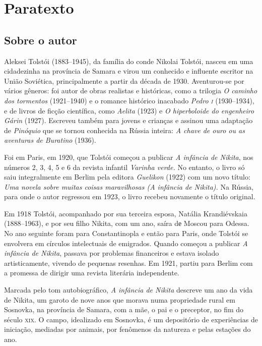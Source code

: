 \chapter{Paratexto}\label{paratexto}

\section{Sobre o autor}\label{para1}

Aleksei Tolstói (1883--1945), da família do conde Nikolai Tolstói,
nasceu em uma cidadezinha na província de Samara e virou um conhecido e
influente escritor na União Soviética, principalmente a partir da década
de 1930. Aventurou-se por vários gêneros: foi autor de obras realistas e
históricas, como a trilogia \emph{O caminho dos tormentos} (1921--1940) e
o romance histórico inacabado \emph{Pedro \textsc{i}} (1930--1934), e de livros de
ficção científica, como \emph{Aelita} (1923) e \emph{O hiperboloide do
engenheiro Gárin} (1927). Escreveu também para jovens e crianças e
assinou uma adaptação de \emph{Pinóquio} que se tornou conhecida na
Rússia inteira: \emph{A chave de ouro ou as aventuras de Buratino}
(1936).

Foi em Paris, em 1920, que Tolstói começou a publicar \emph{A infância
de Nikita}, nos números 2, 3, 4, 5 e 6 da revista infantil \emph{Varinha
verde.} No entanto, o livro só saiu integralmente em Berlim pela editora
\emph{Guelikon} (1922) com um novo título: \emph{Uma novela sobre muitas
coisas maravilhosas (A infância de Nikita).} Na Rússia, para onde o
autor regressou em 1923, o livro recebeu novamente o título original.

Em 1918 Tolstói, acompanhado por sua terceira esposa, Natália
Krandiévskaia (1888--1963), e por seu filho Nikita, com um ano, saíra dе
Moscou para Odessa. No ano seguinte foram para Constantinopla e então
para Paris, onde Tolstói se envolvera em círculos intelectuais de
emigrados. Quando começou a publicar \emph{A infância de Nikita},
passava por problemas financeiros e estava isolado artisticamente,
vivendo de pequenas resenhas. Em 1921, partiu para Berlim com a promessa
de dirigir uma revista literária independente.

Marcada pelo tom autobiográfico, \emph{A infância de Nikita} descreve um
ano da vida de Nikita, um garoto de nove anos que morava numa
propriedade rural em Sosnovka, na província de Samara, com a mãe, o pai
e o preceptor, no fim do século \textsc{xix}. O campo, idealizado em Sosnovka, é
um depositório de experiências de iniciação, mediadas por animais, por
fenômenos da natureza e pelas estações do ano.

